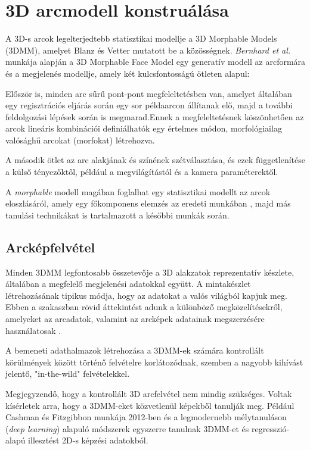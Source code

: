 \documentclass[12pt,a4]{article}
\begin{document}
 
	 \section{3D arcmodell konstruálása}
	 \label{3d}
	 \cite{survey} A 3D-s arcok legelterjedtebb statisztikai modellje a 3D Morphable Models (3DMM), amelyet Blanz és Vetter \cite{blanzvetter} mutatott be a közösségnek. \textit{Bernhard et al.} \cite{3dmm} munkája alapján a 3D Morphable Face Model egy generatív modell az arcformára
	 és a megjelenés modellje, amely két kulcsfontosságú ötleten alapul:
	 
	  Először is, minden arc
	 sűrű pont-pont megfeleltetésben van, amelyet általában egy regisztrációs eljárás során egy sor példaarcon állítanak elő, majd
	 a további feldolgozási lépések során is megmarad.Ennek a megfeleltetésnek köszönhetően az arcok lineáris kombinációi definiálhatók egy értelmes módon, morfológiailag valósághű arcokat (morfokat) létrehozva.
	 
	 
	 A második ötlet az arc alakjának és színének szétválasztása, és ezek függetlenítése a külső tényezőktől, például a megvilágítástól és a kamera paraméterektől.
	 
	  A \textit{morphable} modell magában foglalhat egy statisztikai modellt
	 az arcok eloszlásáról, amely egy főkomponens elemzés az eredeti munkában \cite{blanzvetter}, majd más
	 tanulási technikákat is tartalmazott a későbbi munkák során.
	 
	 \subsection{Arcképfelvétel}
	  Minden 3DMM legfontosabb összetevője a 3D alakzatok reprezentatív készlete, általában a megfelelő megjelenési adatokkal együtt. A mintakészlet létrehozásának tipikus módja, hogy az adatokat a valós világból kapjuk meg. Ebben a szakaszban rövid áttekintést adunk a különböző megközelítésekről, amelyeket az arcadatok, valamint az arcképek adatainak megszerzésére használatosak \cite{3dmm}.
	  
	 A bemeneti adathalmazok létrehozása a 3DMM-ek számára kontrollált körülmények között történő felvételre korlátozódnak, szemben a nagyobb kihívást jelentő, "in-the-wild" felvételekkel.
	 
	 Megjegyzendő, hogy a kontrollált 3D arcfelvétel nem mindig szükséges. Voltak kísérletek arra, hogy a 3DMM-eket közvetlenül képekből tanulják meg. Például Cashman és Fitzgibbon munkája 2012-ben \cite{dolphins} és a legmodernebb mélytanuláson (\textit{deep learning}) alapuló módszerek egyszerre tanulnak 3DMM-et és regresszió-alapú illesztést 2D-s képzési adatokból.
	 
\end{document}
